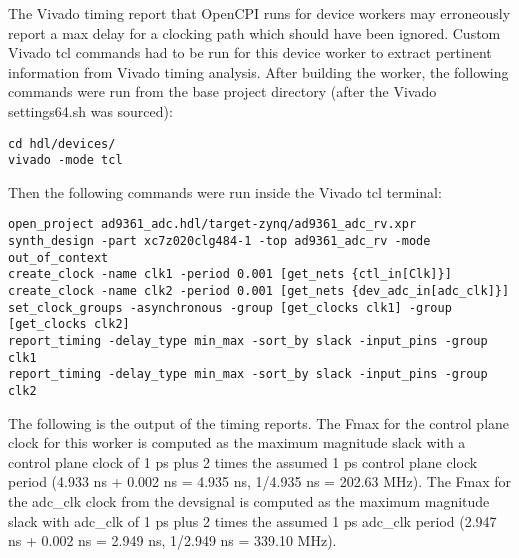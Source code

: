 \documentclass{article}
\begin{document}
The Vivado timing report that OpenCPI runs for device workers may erroneously report a max delay for a clocking path which should have been ignored. Custom Vivado tcl commands had to be run for this device worker to extract pertinent information from Vivado timing analysis. After building the worker, the following commands were run from the base project directory (after the Vivado settings64.sh was sourced):
\begin{lstlisting}
cd hdl/devices/
vivado -mode tcl
\end{lstlisting}
Then the following commands were run inside the Vivado tcl terminal:
\begin{lstlisting}
open_project ad9361_adc.hdl/target-zynq/ad9361_adc_rv.xpr
synth_design -part xc7z020clg484-1 -top ad9361_adc_rv -mode out_of_context
create_clock -name clk1 -period 0.001 [get_nets {ctl_in[Clk]}]
create_clock -name clk2 -period 0.001 [get_nets {dev_adc_in[adc_clk]}]
set_clock_groups -asynchronous -group [get_clocks clk1] -group [get_clocks clk2]
report_timing -delay_type min_max -sort_by slack -input_pins -group clk1
report_timing -delay_type min_max -sort_by slack -input_pins -group clk2
\end{lstlisting}
The following is the output of the timing reports. The Fmax for the control plane clock for this worker is computed as the maximum magnitude slack with a control plane clock of 1 ps plus 2 times the assumed 1 ps control plane clock period (4.933 ns + 0.002 ns = 4.935 ns, 1/4.935 ns = 202.63 MHz). The Fmax for the adc\_clk clock from the devsignal is computed as the maximum magnitude slack with adc\_clk of 1 ps plus 2 times the assumed 1 ps adc\_clk period (2.947 ns + 0.002 ns = 2.949 ns, 1/2.949 ns = 339.10 MHz).
\fontsize{6}{12}\selectfont
\end{document}
